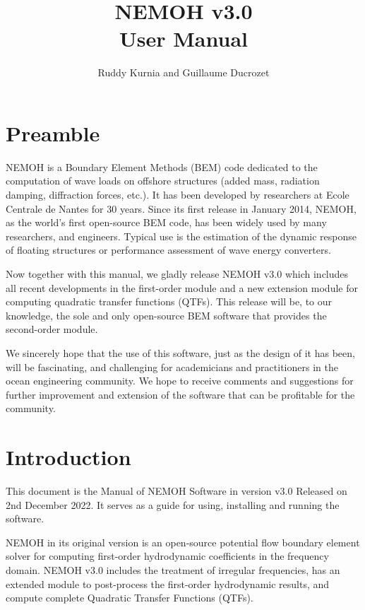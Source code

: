 \documentclass[12pt,a4paper,titlepage]{article}
\begin{document}
\title{NEMOH v3.0\\
User Manual}
\author{Ruddy Kurnia and Guillaume Ducrozet}
\maketitle

\section*{Preamble}
NEMOH is a Boundary Element Methods (BEM) code dedicated to the computation of wave loads on offshore structures (added mass, radiation damping, diffraction forces, etc.). It has been developed by researchers at Ecole Centrale de Nantes for 30 years. Since its first release in January 2014, NEMOH, as the world's first open-source BEM code, has been widely used by many researchers, and engineers. Typical use is the estimation of the dynamic response of floating structures or performance assessment of wave energy converters.

Now together with this manual, we gladly release NEMOH v3.0 which includes all recent developments in the first-order module and a new extension module for computing quadratic transfer functions (QTFs). This release will be, to our knowledge, the sole and only open-source BEM software that provides the second-order module.

We sincerely hope that the use of this software, just as the design of it has been, will be fascinating, and challenging for academicians and practitioners in the ocean engineering community. We hope to receive comments and suggestions for further improvement and extension of the software that can be profitable for the community.
\newpage
\tableofcontents
\newpage
\section{Introduction}

This document is the Manual of NEMOH Software in version v3.0 Released on 2nd December 2022. It serves as a guide for using, installing and running the software.

NEMOH in its original version is an open-source potential flow boundary element solver for computing first-order hydrodynamic coefficients in the frequency domain. NEMOH v3.0 includes the treatment of irregular frequencies, has an extended module to post-process the first-order hydrodynamic results, and compute complete Quadratic Transfer Functions (QTFs).\\
\end{document}
